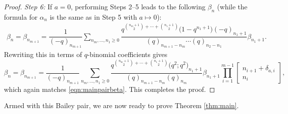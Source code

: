\documentclass[pdftex]{sigma}
\numberwithin{equation}{section}
\begin{document}
\begin{proof}
	{\it Step 6\emph{:}}
	If $a=0$, performing Steps 2--5 leads to the following $\beta_n$ (while the formula for $\alpha_n$ is the same as in Step 5 with $a\mapsto 0$):
	\begin{align*}
		\beta_n=\beta_{n_{m+1}}=
		\dfrac{1}{(-q)_{n_{m+1}}}\sum_{n_m,\dots,n_1\geq 0}
		\dfrac{q^{\binom{n_{m}+1}{2}+\cdots+\binom{n_1+1}{2}}\bigl(1-q^{n_{1}+1}\bigr)(-q)_{n_1+1}}
		{(q)_{n_{m+1}-n_{m}}\cdots (q)_{n_2-n_1}}
		\beta_{n_1+1}.
	\end{align*}
	Rewriting this in terms of $q$-binomial coefficients gives
	\begin{equation*} %
		\beta_n = \beta_{n_{m+1}} = \frac{1}{(-q)_{n_{m+1}}} \sum_{n_m, \dots, n_1 \geq 0} \frac{q^{\binom{n_m+1}{2} + \cdots + \binom{n_1+1}{2}}\bigl(q^2;q^2\bigr)_{n_1+1}}{(q)_{n_{m+1}-n_m} (q)_{n_m}} \beta_{n_1+1} \prod_{i=1}^{m-1} \begin{bmatrix} n_{i+1} + \delta_{a,i} \\ n_i \end{bmatrix},
	\end{equation*}
	which again matches \eqref{eqn:mainpairbeta}. This completes the proof.
\end{proof}

Armed with this Bailey pair, we are now ready to prove Theorem \ref{thm:main}.
\end{document}
